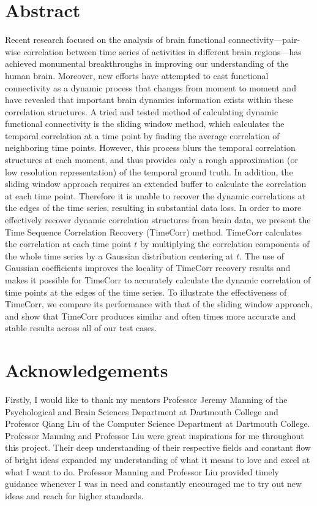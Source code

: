 \documentclass[11pt]{article}
\begin{document}
\section{Abstract}
Recent research focused on the analysis of brain functional connectivity---pair-wise correlation between time series of activities in different brain regions---has achieved monumental breakthroughs in improving our understanding of the human brain. Moreover, new efforts have attempted to cast functional connectivity as a dynamic process that changes from moment to moment and have revealed that important brain dynamics information exists within these correlation structures. A tried and tested method of calculating dynamic functional connectivity is the sliding window method, which calculates the temporal correlation at a time point by finding the average correlation of neighboring time points. However, this process blurs the temporal correlation structures at each moment, and thus provides only a rough approximation (or low resolution representation) of the temporal ground truth. In addition, the sliding window approach requires an extended buffer to calculate the correlation at each time point. Therefore it is unable to recover the dynamic correlations at the edges of the time series, resulting in substantial data loss. In order to more effectively recover dynamic correlation structures from brain data, we present the Time Sequence Correlation Recovery (TimeCorr) method. TimeCorr calculates the correlation at each time point $t$ by multiplying the correlation components of the whole time series by a Gaussian distribution centering at $t$. The use of Gaussian coefficients improves the locality of TimeCorr recovery results and makes it possible for TimeCorr to accurately calculate the dynamic correlation of time points at the edges of the time series. To illustrate the effectiveness of TimeCorr, we compare its performance with that of the sliding window approach, and show that TimeCorr produces similar and often times more accurate and stable results across all of our test cases.

\newpage
\section{Acknowledgements}
Firstly, I would like to thank my mentors Professor Jeremy Manning of the Psychological and Brain Sciences Department at Dartmouth College and Professor Qiang Liu of the Computer Science Department at Dartmouth College. Professor Manning and Professor Liu were great inspirations for me throughout this project. Their deep understanding of their respective fields and constant flow of bright ideas expanded my understanding of what it means to love and excel at what I want to do. Professor Manning and Professor Liu provided timely guidance whenever I was in need and constantly encouraged me to try out new ideas and reach for higher standards.
\end{document}
